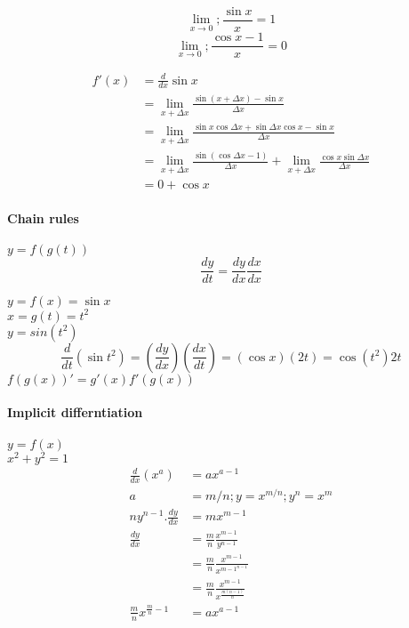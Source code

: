 \documentclass{article}
\begin{document}
    \[ \lim_{x \to 0}; \frac{\sin x}{x} = 1\]
    \[    \lim_{x \to 0}; \frac{\cos x -1}{x} = 0\]

    \begin{align*}
        f'(x) &= \frac{d}{dx} \sin x\\
        &= \lim_{x+\Delta x} \frac{\sin(x+\Delta x) - \sin x}{\Delta x}\\
        &= \lim_{x+\Delta x} \frac{\sin x \cos \Delta x + \sin \Delta x \cos x - \sin x}{\Delta x}\\
        &= \lim_{x+\Delta x} \frac{\sin(\cos \Delta x -1)}{\Delta x} + \lim_{x+\Delta x} \frac{\cos x \sin \Delta x}{\Delta x}\\
        &= 0 + \cos x
    \end{align*}

    \paragraph{Chain rules}
    $ y= f(g(t))$\\
    \[ \frac{dy}{dt} = \frac{dy}{dx}\frac{dx}{dx} \]

    $y = f(x) = \sin x$\\
    $x = g(t) = t^2$\\
    $y = sin(t^2)$\\
    \[ \frac{d}{dt}(\sin t^2) = (\frac{dy}{dx})(\frac{dx}{dt})=(\cos x)(2t) = \cos(t^2)2t \]
    $f(g(x))' = g'(x)f'(g(x))$

    \paragraph{Implicit differntiation}

    $y = f(x) $\\
    $x^2 + y^2 = 1 $\\


    \begin{align*}
        \frac{d}{dx} (x^a) &= ax^{a-1}\\
        a &= m/n ; y = x^{m/n} ; y^n = x^m\\
        ny^{n-1}.\frac{dy}{dx} &= mx^{m-1}\\
        \frac{dy}{dx} &= \frac{m}{n} \frac{x^{m-1}}{y^{n-1}}\\
        &= \frac{m}{n} \frac{x^{m-1}}{x^{{m-1}^{n-1}}}\\
        &= \frac{m}{n} \frac{x^{m-1}}{x^{\frac{m(n-1)}{n}}}\\
        \frac{m}{n}x^{\frac{m}{n} -1} &= ax^{a-1}
    \end{align*}
\end{document}

